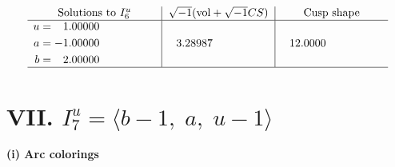 \documentclass[1p]{elsarticle_modified}
\theoremstyle{definition}
\newcommand{\I}{\sqrt{-1}}
\begin{document}
$$\begin{array}{c|c|c}  
\text{Solutions to }I^u_{6}& \I (\text{vol} + \sqrt{-1}CS) & \text{Cusp shape}\\
 \hline 
\begin{aligned}
u &= \phantom{-}1.00000\phantom{ +0.000000I} \\
a &= -1.00000\phantom{ +0.000000I} \\
b &= \phantom{-}2.00000\phantom{ +0.000000I}\end{aligned}
 & \phantom{-}3.28987\phantom{ +0.000000I} & \phantom{-}12.0000\phantom{ +0.000000I}\\
 \hline 
 \end{array}$$\newpage\newpage\renewcommand{\arraystretch}{1}
\centering \section*{VII. $I^u_{7}= \langle b-1,\;a,\;u-1 \rangle$}
\flushleft \textbf{(i) Arc colorings}\\
\end{document}
